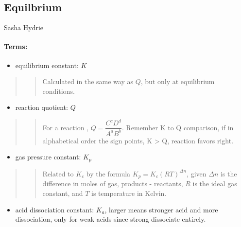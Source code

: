 \documentclass[]{article}
\date{}
\providecommand{\tightlist}{%
  \setlength{\itemsep}{0pt}\setlength{\parskip}{0pt}}
\let\oldparagraph\paragraph
\renewcommand{\paragraph}[1]{\oldparagraph{#1}\mbox{}}
\begin{document}
\subsection{Equilbrium}\label{equilbrium}

\hfill{Sasha Hydrie}

\paragraph{Terms:}\label{terms}

\begin{itemize}
\tightlist
\item
  equilibrium eonstant: \(K\)
\end{itemize}

\begin{quote}
\begin{quote}
Calculated in the same way as \(Q\), but only at equilibrium conditions.
\end{quote}
\end{quote}

\begin{itemize}
\tightlist
\item
  reaction quotient: \(Q\)
\end{itemize}

\begin{quote}
\begin{quote}
For a reaction , \(Q=\dfrac{C^cD^d}{A^aB^b}\).
Remember K to Q comparison, if in alphabetical order the sign points, K
\textgreater{} Q, reaction favors right.
\end{quote}
\end{quote}

\begin{itemize}
\tightlist
\item
  gas pressure constant: \(K_p\)
\end{itemize}

\begin{quote}
\begin{quote}
Related to \(K_c\) by the formula \(K_p=K_c(RT)^{\Delta n}\), given
\(\Delta n\) is the difference in moles of gas, products - reactants,
\(R\) is the ideal gas constant, and \(T\) is temperature in Kelvin.
\end{quote}
\end{quote}

\begin{itemize}
\tightlist
\item
  acid dissociation constant: \(K_a\), larger means stronger acid and
  more dissociation, only for weak acids since strong dissociate
  entirely.
\end{itemize}
\end{document}
